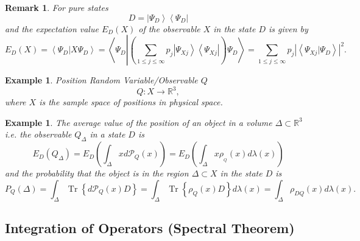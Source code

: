 \documentclass[aps,preprint]{revtex4}%
\newtheorem{example}[theorem]{Example}
\newtheorem{remark}[theorem]{Remark}
\begin{document}
\begin{remark}
For pure states
\begin{equation}
D=\left\vert \Psi_{D}\right\rangle \left\langle \Psi_{D}\right\vert
\end{equation}
and the expectation value $E_{D}\left(  X\right)  $ of the observable $X$ in
the state $D$ is given by
\begin{equation}
E_{D}\left(  X\right)  =\left\langle \Psi_{D}\left\vert X\Psi_{D}\right.
\right\rangle =\left\langle \Psi_{D}\left\vert \left(  \sum_{1\leq j\leq
\infty}p_{j}\left\vert \Psi_{Xj}\right\rangle \left\langle \Psi_{Xj}%
\right\vert \right)  \Psi_{D}\right.  \right\rangle =\sum_{1\leq j\leq\infty
}p_{j}\left\vert \left\langle \Psi_{Xj}\left\vert \Psi_{D}\right.
\right\rangle \right\vert ^{2}.
\end{equation}

\end{remark}

\begin{example}
\emph{Position Random Variable/Observable} $Q$%
\begin{equation}
Q:X\rightarrow\mathbb{R}^{3},
\end{equation}
where $X$ is the sample space of \emph{positions} in physical space.
\end{example}

\begin{example}
The \emph{average value of the position of an object in a volume }%
$\Delta\subset\mathbb{R}^{3}$ i.e. the observable $Q_{\Delta}$ in a state $D$
is
\begin{equation}
E_{D}\left(  Q_{\Delta}\right)  =E_{D}\left(  \int_{\Delta}xd\mathcal{P}%
_{Q}\left(  x\right)  \right)  =E_{D}\left(  \int_{\Delta}x\rho_{_{Q}}\left(
x\right)  d\lambda\left(  x\right)  \right)
\end{equation}
and the probability that the object is in the region $\Delta\subset X$ in the
state $D$ is
\begin{equation}
P_{Q}\left(  \Delta\right)  =\int_{\Delta}\operatorname{Tr}\left\{
d\mathcal{P}_{Q}\left(  x\right)  D\right\}  =\int_{\Delta}\operatorname{Tr}%
\left\{  \rho_{Q}\left(  x\right)  D\right\}  d\lambda\left(  x\right)
=\int_{\Delta}\rho_{DQ}\left(  x\right)  d\lambda\left(  x\right)  .
\end{equation}

\end{example}

\subsection{Integration of Operators (Spectral Theorem)}
\end{document}
